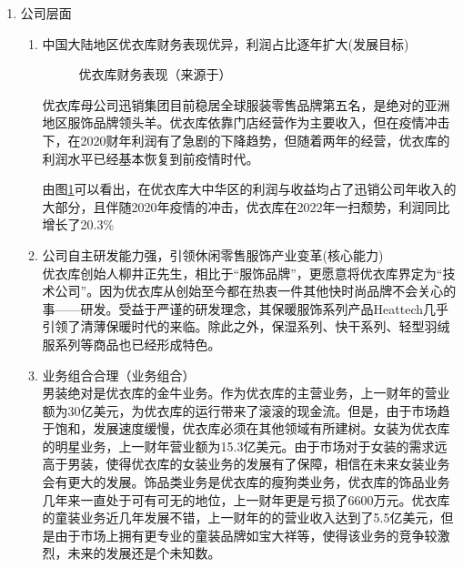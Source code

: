 \documentclass{xjtureport}
\begin{document}
\begin{enumerate} 
    \item 公司层面
    \begin{enumerate}
    \item 中国大陆地区优衣库财务表现优异，利润占比逐年扩大(发展目标)\\
    \begin{figure}[H]
    \centering
    \caption{优衣库财务表现（来源于\cite{11}）}
    \label{优衣库财务表现}
\end{figure}
优衣库母公司迅销集团目前稳居全球服装零售品牌第五名，是绝对的亚洲地区服饰品牌领头羊。优衣库依靠门店经营作为主要收入，但在疫情冲击下，在2020财年利润有了急剧的下降趋势，但随着两年的经营，优衣库的利润水平已经基本恢复到前疫情时代。

    由图\ref{优衣库财务表现}可以看出，在优衣库大中华区的利润与收益均占了迅销公司年收入的大部分，且伴随2020年疫情的冲击，优衣库在2022年一扫颓势，利润同比增长了20.3\%\cite{ref11}
    
    \item 公司自主研发能力强，引领休闲零售服饰产业变革(核心能力)\\
    优衣库创始人柳井正先生，相比于“服饰品牌”，更愿意将优衣库界定为“技术公司”。\cite{12}因为优衣库从创始至今都在热衷一件其他快时尚品牌不会关心的事——研发。受益于严谨的研发理念，其保暖服饰系列产品Heattech几乎引领了清薄保暖时代的来临。除此之外，保湿系列、快干系列、轻型羽绒服系列等商品也已经形成特色。
    \item 业务组合合理（业务组合）\\
    男装绝对是优衣库的金牛业务。作为优衣库的主营业务，上一财年的营业额为30亿美元，为优衣库的运行带来了滚滚的现金流。但是，由于市场趋于饱和，发展速度缓慢，优衣库必须在其他领域有所建树。女装为优衣库的明星业务，上一财年营业额为15.3亿美元。由于市场对于女装的需求远高于男装，使得优衣库的女装业务的发展有了保障，相信在未来女装业务会有更大的发展。饰品类业务是优衣库的瘦狗类业务，优衣库的饰品业务几年来一直处于可有可无的地位，上一财年更是亏损了6600万元。优衣库的童装业务近几年发展不错，上一财年的的营业收入达到了5.5亿美元，但是由于市场上拥有更专业的童装品牌如宝大祥等，使得该业务的竞争较激烈，未来的发展还是个未知数。\cite{ref11}
    

\end{enumerate}
\end{enumerate}
\end{document}
